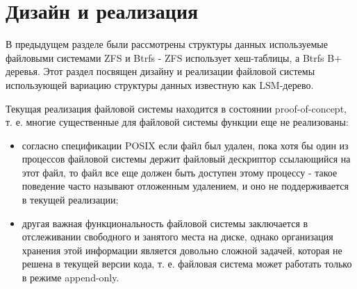 \chapter{Дизайн и реализация}

В предыдущем разделе были рассмотрены структуры данных используемые файловыми
системами ZFS и Btrfs - ZFS использует хеш-таблицы, а Btrfs B+ деревья. Этот
раздел посвящен дизайну и реализации файловой системы использующей вариацию
структуры данных известную как LSM-дерево.

Текущая реализация файловой системы находится в состоянии proof-of-concept, т.
е. многие существенные для файловой системы функции еще не реализованы:
\begin{itemize}
  \item согласно спецификации POSIX если файл был удален, пока хотя бы один из
        процессов файловой системы держит файловый дескриптор ссылающийся на
        этот файл, то файл все еще должен быть доступен этому процессу - такое
        поведение часто называют отложенным удалением, и оно не поддерживается
        в текущей реализации;
  \item другая важная функциональность файловой системы заключается в
        отслеживании свободного и занятого места на диске, однако организация
        хранения этой информации является довольно сложной задачей, которая не
        решена в текущей версии кода, т. е. файловая система может работать
        только в режиме append-only.
\end{itemize}




